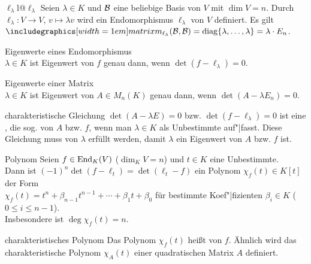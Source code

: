 \begin{xDef}{$\ell_\lambda$}{l@$\ell_\lambda$}
    Seien $\lambda \in K$ und $\mathcal{B}$ eine beliebige Basis von $V$ mit
    $\dim V = n$.
    Durch $\ell_\lambda: V \rightarrow V$, $v \mapsto \lambda v$ wird ein
    Endomorphismus $\ell_\lambda$ von $V$ definiert.
    Es gilt $\hommatrix{\ell_\lambda}{B}{B} =
    \diag\{\lambda, \ldots, \lambda\} = \lambda \cdot E_n$.
\end{xDef}

\begin{Satz}{Eigenwerte eines Endomorphismus} \\
    $\lambda \in K$ ist Eigenwert von $f$ genau dann, wenn
    $\det(f - \ell_\lambda) = 0$.
\end{Satz}

\begin{Satz}{Eigenwerte einer Matrix} \\
    $\lambda \in K$ ist Eigenwert von $A \in M_n(K)$
    genau dann, wenn $\det(A - \lambda E_n) = 0$.
\end{Satz}

\begin{Def}{charakteristische Gleichung}
    $\det(A - \lambda E) = 0$ bzw. $\det(f - \ell_\lambda) = 0$ ist
    eine , die sog.
     von $A$ bzw. $f$,
    wenn man $\lambda \in K$ als Unbestimmte auf"|fasst.
    Diese Gleichung muss von $\lambda$ erfüllt werden, damit
    $\lambda$ ein Eigenwert von $A$ bzw. $f$ ist.
\end{Def}

\begin{Satz}{Polynom}
    Seien $f \in \operatorname{End}_K(V)$ ($\dim_K V = n$) und $t \in K$
    eine Unbestimmte. \\
    Dann ist $(-1)^n \det(f - \ell_t) = \det(\ell_t - f)$ ein Polynom
    $\chi_f(t) \in K[t]$ der Form \\
    $\chi_f(t) = t^n + \beta_{n-1} t^{n-1} + \cdots + \beta_1 t + \beta_0$
    für bestimmte Koef"|fizienten $\beta_i \in K$ ($0 \le i \le n - 1$). \\
    Insbesondere ist $\deg \chi_f(t) = n$.
\end{Satz}

\begin{Def}{charakteristisches Polynom}
    Das Polynom $\chi_f(t)$ heißt  von $f$.
    Ähnlich wird das charakteristische Polynom $\chi_A(t)$ einer
    quadratischen Matrix $A$ definiert.
\end{Def}

